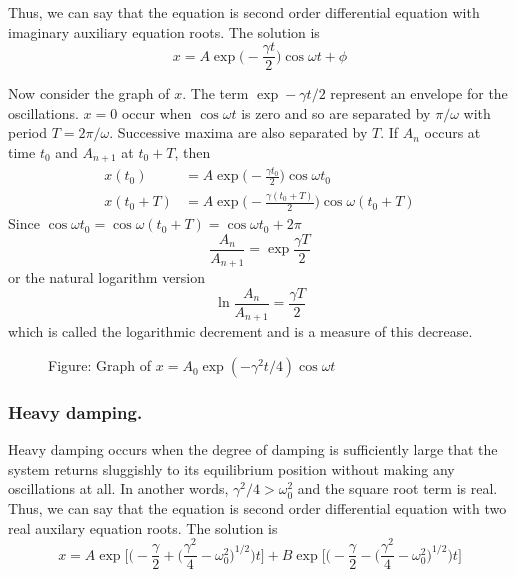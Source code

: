 \documentclass[../../../main.tex]{subfiles}
\begin{document}
Thus, we can say that the equation is second order differential equation with imaginary auxiliary equation roots. The solution is
\begin{equation*}
    x=A\exp\biggl(-\frac{\gamma t}{2}\biggr)\cos\omega t +\phi
\end{equation*} 

Now consider the graph of $x$. The term $\exp -\gamma t/2$ represent an envelope for the oscillations. $x=0$ occur when $\cos\omega t$ is zero and so are separated by $\pi/\omega$ with period $T=2\pi/\omega$. Successive maxima are also separated by $T$. If $A_n$ occurs at time $t_0$ and $A_{n+1}$ at $t_0+T$, then 
\begin{align*}
    x(t_0)&=A\exp\biggl(-\frac{\gamma t_0}{2}\biggr)\cos\omega t_0\\
    x(t_0+T)&=A\exp\biggl(-\frac{\gamma (t_0+T)}{2}\biggr)\cos\omega (t_0+T)
\end{align*}
Since $\cos\omega t_0=\cos\omega (t_0+T)=\cos\omega t_0+2\pi$
\begin{equation*}
    \frac{A_n}{A_{n+1}}=\exp \frac{\gamma T}{2}
\end{equation*} 
or the natural logarithm version
\begin{equation*}
    \ln \frac{A_n}{A_{n+1}}=\frac{\gamma T}{2}
\end{equation*}
which is called the logarithmic decrement and is a measure of this decrease. 
\begin{figure*}[b]
    \centering
    \caption*{Figure: Graph of $x=A_0\exp(-\gamma^2t/4)\cos \omega t$}
\end{figure*}

\subsubsection{Heavy damping.} Heavy damping occurs when the degree of damping is sufficiently large that the system returns sluggishly to its equilibrium position without making any oscillations at all. In another words, $\gamma^2/4 > \omega_0^2$ and the square root term is real. Thus, we can say that the equation is second order differential equation with two real auxilary equation roots. The solution is
\begin{equation*}
    x=A\exp \biggl[\bigg(-\frac{\gamma}{2} + \big(\frac{\gamma^2}{4}-\omega_0^2\big)^{1/2}\bigg)t\biggr] +B \exp \biggl[\bigg(-\frac{\gamma}{2} - \big(\frac{\gamma^2}{4}-\omega_0^2\big)^{1/2}\bigg)t\biggr]
\end{equation*}
\end{document}

